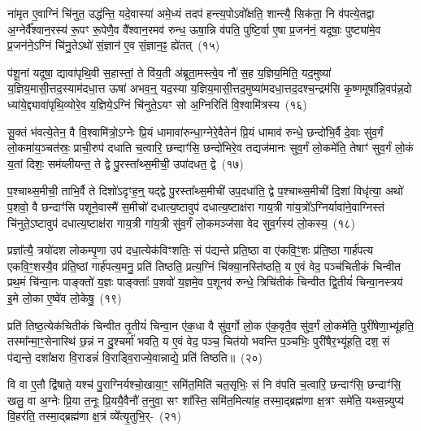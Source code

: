 ना॑मृत ए॒वाग्निं चि॑नुत॒ उद्ध॑न्ति॒ यदे॒वास्या॑ अमे॒ध्यं तदप॑ हन्त्य॒पो\-ऽवो᳚क्षति॒ शान्त्यै॒ सिक॑ता॒ नि व॑पत्ये॒तद्वा अ॒ग्नेर्वै᳚श्वान॒रस्य॑ रू॒पꣳ रू॒पेणै॒व वै᳚श्वान॒रमव॑ रुन्ध॒ ऊषा॒न्नि व॑पति॒ पुष्टि॒र्वा ए॒षा प्र॒जन॑नं॒ यदूषाः॒ पुष्ट्या॑मे॒व प्र॒जन॑ने॒\-ऽग्निं चि॑नु॒ते\-ऽथो॑ सं॒ज्ञान॑ ए॒व सं॒ज्ञान॒ꣴ॒ ह्ये॑तत्~(१५)\ip

प॑शू॒नां यदूषा॒ द्यावा॑\-पृथि॒वी स॒हास्तां॒ ते वि॑य॒ती अ॑ब्रूता॒मस्त्वे॒व नौ॑ स॒ह य॒ज्ञिय॒मिति॒ यद॒मुष्या॑ य॒ज्ञिय॒मासी॒त्तद॒\-स्याम॑दधा॒त्त ऊषा॑ अभव॒न्॒ यद॒स्या य॒ज्ञिय॒मासी॒त्तद॒मुष्या॑\-मदधा॒त्तद॒\-दश्च॒न्द्रम॑सि कृ॒ष्णमूषा᳚न्नि॒वप॑न्न॒दो ध्या॑ये॒द्द्यावा॑पृथि॒व्योरे॒व य॒ज्ञिये॒\-ऽग्निं चि॑नुते॒\-ऽयꣳ सो अ॒ग्निरिति॑ वि॒श्वामि॑त्रस्य~(१६)\ip

सू॒क्तं भ॑वत्ये॒तेन॒ वै वि॒श्वामि॑त्रो॒\-ऽग्नेः प्रि॒यं धामावा॑रुन्धा॒ग्नेरे॒वैतेन॑ प्रि॒यं धामाव॑ रुन्धे॒ छन्दो॑भि॒र्वै दे॒वाः सु॑व॒र्गं लो॒कमा॑य॒ञ्चत॑स्रः॒ प्राची॒रुप॑ दधाति च॒त्वारि॒ छन्दाꣳ॑सि॒ छन्दो॑भिरे॒व तद्यज॑मानः सुव॒र्गं लो॒कमे॑ति॒ तेषाꣳ॑ सुव॒र्गं लो॒कं य॒तां दिशः॒ सम॑व्लीयन्त॒ ते द्वे पु॒रस्ता᳚थ्स॒मीची॒ उपा॑दधत॒ द्वे~(१७)\ip

प॒श्चाथ्स॒मीची॒ ताभि॒र्वै ते दिशो॑\-ऽदृꣳह॒न्॒ यद्द्वे पु॒रस्ता᳚थ्स॒मीची॑ उप॒\-दधा॑ति॒ द्वे प॒श्चाथ्स॒मीची॑ दि॒शां विधृ॑त्या॒ अथो॑ प॒शवो॒ वै छन्दाꣳ॑सि पशूने॒वास्मै॑ स॒मीचो॑ दधात्य॒ष्टावुप॑ दधात्य॒ष्टाक्ष॑रा गाय॒त्री गा॑य॒त्रो᳚\-ऽग्निर्यावा॑ने॒वाग्निस्तं चि॑नुते॒\-ऽष्टावुप॑ दधात्य॒ष्टाक्ष॑रा गाय॒त्री गा॑य॒त्री सु॑व॒र्गं लो॒कमञ्ज॑सा वेद सुव॒र्गस्य॑ लो॒कस्य॒~(१८)\ip

प्रज्ञा᳚त्यै॒ त्रयो॑दश लोकम्पृ॒णा उप॑ दधा॒त्येक॑विꣳशतिः॒ सं प॑द्यन्ते प्रति॒ष्ठा वा ए॑कवि॒ꣳ॒शः प्र॑ति॒ष्ठा गार्\mbox{}ह॑पत्य एकवि॒ꣳ॒शस्यै॒व प्र॑ति॒ष्ठां गार्\mbox{}ह॑पत्य॒मनु॒ प्रति॑ तिष्ठति॒ प्रत्य॒ग्निं चि॑क्या॒नस्ति॑ष्ठति॒ य ए॒वं वेद॒ पञ्च॑चितीकं चिन्वीत प्रथ॒मं चि॑न्वा॒नः पाङ्क्तो॑ य॒ज्ञः पाङ्क्ताः᳚ प॒शवो॑ य॒ज्ञमे॒व प॒शूनव॑ रुन्धे॒ त्रिचि॑तीकं चिन्वीत द्वि॒तीयं॑ चिन्वा॒नस्त्रय॑ इ॒मे लो॒का ए॒ष्वे॑व लो॒केषु॒~(१९)\ip

प्रति॑ तिष्ठ॒त्येक॑चितीकं चिन्वीत तृ॒तीयं॑ चिन्वा॒न ए॑क॒धा वै सु॑व॒र्गो लो॒क ए॑क॒वृतै॒व सु॑व॒र्गं लो॒कमे॑ति॒ पुरी॑षेणा॒भ्यू॑हति॒ तस्मा᳚न्मा॒ꣳ॒सेनास्थि॑ छ॒न्नं न दु॒श्चर्मा॑ भवति॒ य ए॒वं वेद॒ पञ्च॒ चित॑यो भवन्ति प॒ञ्चभिः॒ पुरी॑षैर॒भ्यू॑हति॒ दश॒ सं प॑द्यन्ते॒ दशा᳚क्षरा वि॒राडन्नं॑ वि॒राड्वि॒राज्ये॒वान्नाद्ये॒ प्रति॑ तिष्ठति॥~(२०)\ip

{}

वि वा ए॒तौ द्वि॑षाते॒ यश्च॑ पु॒राग्निर्यश्चो॒खाया॒ꣳ॒ समि॑त॒मिति॑ चत॒सृभिः॒ सं नि व॑पति च॒त्वारि॒ छन्दाꣳ॑सि॒ छन्दाꣳ॑सि॒ खलु॒ वा अ॒ग्नेः प्रि॒या त॒नूः प्रि॒ययै॒वैनौ॑ त॒नुवा॒ सꣳ शा᳚स्ति॒ समि॑त॒मित्या॑ह॒ तस्मा॒द्ब्रह्म॑णा क्ष॒त्रꣳ समे॑ति॒ यथ्स॒न्न्युप्य॑ वि॒हर॑ति॒ तस्मा॒द्ब्रह्म॑णा क्ष॒त्रं व्ये᳚त्यृ॒तुभि॒र्-~(२१)\ip

